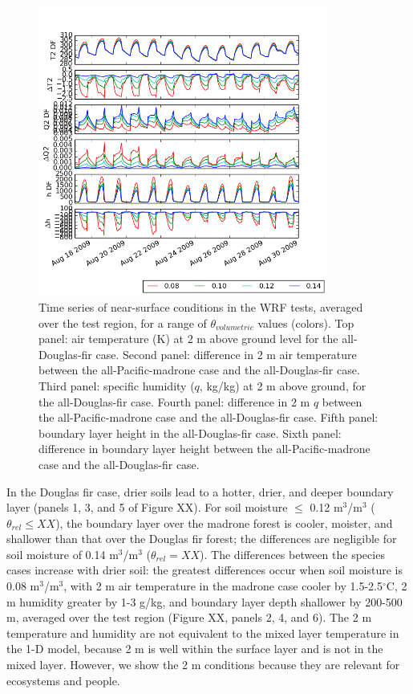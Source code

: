 \begin{figure}[here]
\includegraphics[width=0.85\textwidth]{ch2-BL/figures/T_Q_h_d02.png}
\caption{Time series of near-surface conditions in the WRF tests, averaged over the test region, for a range of $\theta_{volumetric}$ values (colors).  Top panel: air temperature (K) at 2 m above ground level for the all-Douglas-fir case.  Second panel: difference in 2 m air temperature between the all-Pacific-madrone case and the all-Douglas-fir case.  Third panel: specific humidity ($q$, kg/kg) at 2 m above ground, for the all-Douglas-fir case.  Fourth panel: difference in 2 m $q$ between the all-Pacific-madrone case and the all-Douglas-fir case.  Fifth panel: boundary layer height in the all-Douglas-fir case.  Sixth panel: difference in boundary layer height between the all-Pacific-madrone case and the all-Douglas-fir case.}
\label{fig:BL_WRFtseries}
\end{figure}

In the Douglas fir case, drier soils lead to a hotter, drier, and deeper boundary layer (panels 1, 3, and 5 of Figure XX).  For soil moisture $\le$ 0.12 m$^3$/m$^3$ ($\theta_{rel} \le XX$), the boundary layer over the madrone forest is cooler, moister, and shallower than that over the Douglas fir forest; the differences are negligible for soil moisture of 0.14 m$^3$/m$^3$ ($\theta_{rel} = XX$).  The differences between the species cases increase with drier soil: the greatest differences occur when soil moisture is 0.08 m$^3$/m$^3$, with 2 m air temperature in the madrone case cooler by 1.5-2.5$^\circ$C, 2 m humidity greater by 1-3 g/kg, and boundary layer depth shallower by 200-500 m, averaged over the test region (Figure XX, panels 2, 4, and 6).  The 2 m temperature and humidity are not equivalent to the mixed layer temperature in the 1-D model, because 2 m is well within the surface layer and is not in the mixed layer.  However, we show the 2 m conditions because they are relevant for ecosystems and people.

